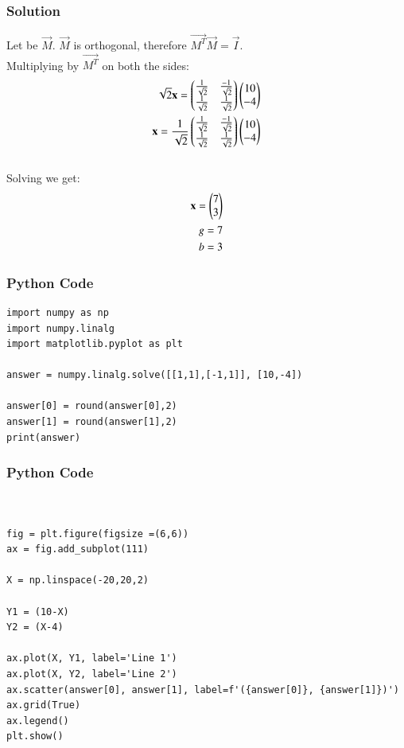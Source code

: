 \documentclass{beamer}
\begin{document}
\begin{frame}[fragile]
    \frametitle{Solution}
Let  be $\vec{M}$. $\vec{M}$ is orthogonal, therefore $\vec{M^T}\vec{M} = \vec{I}$.\\
Multiplying by $\vec{M^T}$ on both the sides:
\begin{align}
\sqrt{2}\mathbf{x} = \begin{pmatrix}\frac{1}{\sqrt{2}} & \frac{-1}{\sqrt{2}} \\  \frac{1}{\sqrt{2}}& \frac{1}{\sqrt{2}}\end{pmatrix} \begin{pmatrix}10\\-4\end{pmatrix}\\
\mathbf{x} = \frac{1}{\sqrt{2}}\begin{pmatrix}\frac{1}{\sqrt{2}} & \frac{-1}{\sqrt{2}} \\  \frac{1}{\sqrt{2}}& \frac{1}{\sqrt{2}}\end{pmatrix} \begin{pmatrix}10\\-4\end{pmatrix}
\end{align}\\
Solving we get:\begin{align}
\mathbf{x} = \begin{pmatrix}7\\3\end{pmatrix} \\
g = 7\\
b=3
\end{align}
\end{frame}





\begin{frame}[fragile]
    \frametitle{Python Code}

    \begin{lstlisting}
import numpy as np
import numpy.linalg 
import matplotlib.pyplot as plt

answer = numpy.linalg.solve([[1,1],[-1,1]], [10,-4])

answer[0] = round(answer[0],2)
answer[1] = round(answer[1],2)
print(answer)
\end{lstlisting} 
\end{frame}

\begin{frame}[fragile]
    \frametitle{Python Code}

    \begin{lstlisting}


fig = plt.figure(figsize =(6,6))
ax = fig.add_subplot(111)

X = np.linspace(-20,20,2)

Y1 = (10-X)
Y2 = (X-4)

ax.plot(X, Y1, label='Line 1')
ax.plot(X, Y2, label='Line 2')
ax.scatter(answer[0], answer[1], label=f'({answer[0]}, {answer[1]})')
ax.grid(True)
ax.legend()
plt.show()

    \end{lstlisting}
\end{frame}
\end{document}
